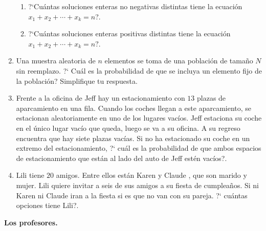 \documentclass[a4paper,11pt]{report}
\begin{document}
\begin{enumerate}
\begin{enumerate}
	\item ?`Cu\'antas soluciones enteras no negativas distintas tiene la ecuaci\'on $x_1 + x_2 + \cdots + x_k = n$?.
	\item ?`Cu\'antas soluciones enteras positivas distintas tiene la ecuaci\'on $x_1 + x_2 + \cdots + x_k = n?$.
\end{enumerate}
\item Una muestra aleatoria de $n$ elementos se toma de una poblaci\'on de tama\~no $N$ sin reemplazo. ?` Cu\'al es la probabilidad de que se incluya un elemento fijo de la poblaci\'on? Simplifique tu respuesta. 

\item Frente a la oficina de Jeff hay un estacionamiento con $13$ plazas de aparcamiento en una fila. Cuando los coches llegan a este aparcamiento, se estacionan aleatoriamente en uno de los lugares vac\'ios. Jeff estaciona su coche en el \'unico lugar vac\'io que queda, luego se va a su oficina. A su regreso encuentra que hay siete plazas vac\'ias. Si no ha estacionado su coche en un  extremo del  estacionamiento, ?` cu\'al es la probabilidad de que ambos espacios de estacionamiento que est\'an al lado del auto de Jeff est\'en vac\'ios?.

\item Lili tiene $20$ amigos. Entre ellos est\'an Karen y Claude , que son marido y mujer. Lili quiere invitar a seis de sus amigos a su fiesta de cumplea\~nos. Si ni Karen ni Claude iran  a la fiesta si es que no van  con su pareja. ?` cu\'antas opciones tiene Lili?.

\end{enumerate}

\begin{flushright}
{\bfseries Los profesores.}
\end{flushright}
\end{document}
